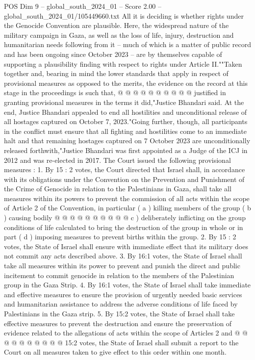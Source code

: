 \begin{textsample}{POS Dim 9 – global\_south\_2024\_01 – Score 2.00 – global\_south\_2024\_01/105449660.txt}
All it is deciding is whether rights under the Genocide Convention are plausible.
Here, the widespread nature of the military campaign in Gaza, as well as the loss of life, injury, destruction and humanitarian needs following from it -- much of which is a matter of public record and has been ongoing since October 2023 -- are by themselves capable of supporting a plausibility finding with respect to rights under Article II.""Taken together and, bearing in mind the lower standards that apply in respect of provisional measures as opposed to the merits, the evidence on the record at this stage in the proceedings is such that, @ @ @ @ @ @ @ @ @ @ justified in granting provisional measures in the terms it did,"Justice Bhandari said.
At the end, Justice Bhandari appealed to end all hostilities and unconditional release of all hostages captured on October 7, 2023."Going further, though, all participants in the conflict must ensure that all fighting and hostilities come to an immediate halt and that remaining hostages captured on 7 October 2023 are unconditionally released forthwith,"Justice Bhandari was first appointed as a Judge of the ICJ in 2012 and was re-elected in 2017.
The Court issued the following provisional measures : 1.
By 15 : 2 votes, the Court directed that Israel shall, in accordance with its obligations under the Convention on the Prevention and Punishment of the Crime of Genocide in relation to the Palestinians in Gaza, shall take all measures within its powers to prevent the commission of all acts within the scope of Article 2 of the Convention, in particular ( a ) killing members of the group ( b ) causing bodily @ @ @ @ @ @ @ @ @ @ c ) deliberately inflicting on the group conditions of life calculated to bring the destruction of the group in whole or in part ( d ) imposing measures to prevent births within the group. 2.
By 15 : 2 votes, the State of Israel shall ensure with immediate effect that its military does not commit any acts described above. 3.
By 16:1 votes, the State of Israel shall take all measures within its power to prevent and punish the direct and public incitement to commit genocide in relation to the members of the Palestinian group in the Gaza Strip. 4.
By 16:1 votes, the State of Israel shall take immediate and effective measures to ensure the provision of urgently needed basic services and humanitarian assistance to address the adverse conditions of life faced by Palestinians in the Gaza strip. 5.
By 15:2 votes, the State of Israel shall take effective measures to prevent the destruction and ensure the preservation of evidence related to the allegations of acts within the scope of Articles 2 and @ @ @ @ @ @ @ @ @ @ 15:2 votes, the State of Israel shall submit a report to the Court on all measures taken to give effect to this order within one month.

\end{textsample}

